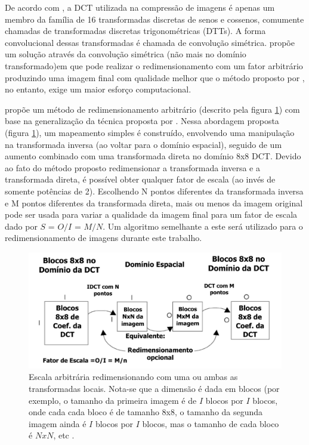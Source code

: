 De acordo com , a DCT utilizada na compressão de imagens é apenas um membro da família de 16 transformadas discretas de senos e cossenos, comumente chamadas de transformadas discretas trigonométricas (DTTs). A forma convolucional dessas transformadas é chamada de convolução simétrica.  propõe um solução através da convolução simétrica (não mais no domínio transformado)em que pode realizar o redimensionamento com um fator arbitrário produzindo uma imagem final com qualidade melhor que o método proposto por , no entanto, exige um maior esforço computacional.

 propõe um método de redimensionamento arbitrário (descrito pela figura \ref{DCT_RES}) com base na generalização da técnica proposta por . Nessa abordagem proposta (figura \ref{DCT_RES}), um mapeamento simples é construído, envolvendo uma manipulação na transformada inversa (ao voltar para o domínio espacial), seguido de um aumento combinado com uma transformada direta no domínio 8x8 DCT. Devido ao fato do método proposto redimensionar a transformada inversa e a transformada direta, é possível obter qualquer fator de escala (ao invés de somente potências de 2). Escolhendo N pontos diferentes da transformada inversa e M pontos diferentes da transformada direta, mais ou menos da imagem original pode ser usada para variar a qualidade da imagem final para um fator de escala dado por $S$ = $O/I$ = $M/N$.  Um algoritmo semelhante a este será utilizado para o redimensionamento de imagens durante este trabalho. 

\begin{figure}[h]
	\centering
	\includegraphics[scale=0.6]
{figuras/DCT_RES.pdf}
	\caption{Escala arbitrária redimensionando com uma ou ambas as transformadas locais. Nota-se que a dimensão é dada em blocos (por exemplo, o tamanho da primeira imagem é de $I$ blocos por $I$ blocos, onde cada cada bloco é de tamanho 8x8, o tamanho da segunda imagem ainda é $I$ blocos por $I$ blocos, mas o tamanho de cada bloco é $NxN$, etc \cite{salazar2007complexity}.}
	\label{DCT_RES}
\end{figure}

